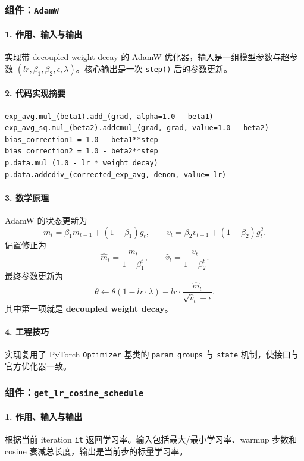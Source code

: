 \documentclass[UTF8,a4paper,11pt]{ctexart}
\begin{document}
\subsubsection{组件：\texttt{AdamW}}
\paragraph{1. 作用、输入与输出}
实现带 decoupled weight decay 的 AdamW 优化器，输入是一组模型参数与超参数 \((lr,\beta_1,\beta_2,\epsilon,\lambda)\)。核心输出是一次 \texttt{step()} 后的参数更新。

\paragraph{2. 代码实现摘要}
\begin{lstlisting}
exp_avg.mul_(beta1).add_(grad, alpha=1.0 - beta1)
exp_avg_sq.mul_(beta2).addcmul_(grad, grad, value=1.0 - beta2)
bias_correction1 = 1.0 - beta1**step
bias_correction2 = 1.0 - beta2**step
p.data.mul_(1.0 - lr * weight_decay)
p.data.addcdiv_(corrected_exp_avg, denom, value=-lr)
\end{lstlisting}

\paragraph{3. 数学原理}
AdamW 的状态更新为
\[
m_t = \beta_1 m_{t-1} + (1-\beta_1) g_t,
\qquad
v_t = \beta_2 v_{t-1} + (1-\beta_2) g_t^2.
\]
偏置修正为
\[
\hat{m}_t = \frac{m_t}{1-\beta_1^t},
\qquad
\hat{v}_t = \frac{v_t}{1-\beta_2^t}.
\]
最终参数更新为
\[
\theta \leftarrow \theta (1 - lr \cdot \lambda)
 - lr \cdot \frac{\hat{m}_t}{\sqrt{\hat{v}_t} + \epsilon}.
\]
其中第一项就是 \textbf{decoupled weight decay}。

\paragraph{4. 工程技巧}
实现复用了 PyTorch \texttt{Optimizer} 基类的 \texttt{param\_groups} 与 \texttt{state} 机制，使接口与官方优化器一致。

\subsubsection{组件：\texttt{get\_lr\_cosine\_schedule}}
\paragraph{1. 作用、输入与输出}
根据当前 iteration \texttt{it} 返回学习率。输入包括最大/最小学习率、warmup 步数和 cosine 衰减总长度，输出是当前步的标量学习率。
\end{document}
